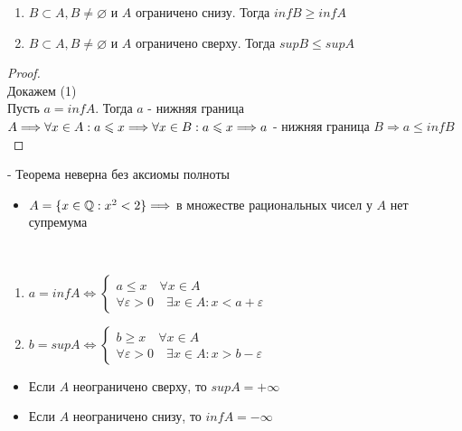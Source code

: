 \follow
\begin{enumerate}
    \item $B \subset A, B \neq \varnothing $ и $ A $ ограничено снизу. Тогда $inf B \geqslant inf A$
    \item $B \subset A, B \neq \varnothing $ и $ A $ ограничено сверху. Тогда $sup B \leqslant sup A$
\end{enumerate}
\begin{proof}
    \quad \\
    Докажем (1) \\
    Пусть $a = inf A$. Тогда $a$ - нижняя граница $A \Longrightarrow \forall x \in
    A : a \leqslant x \Longrightarrow \forall x \in B : a \leqslant x \Longrightarrow \\
    a$ - нижняя граница $B \Longrightarrow a \leqslant inf B$  
\end{proof}
\notice - Теорема неверна без аксиомы полноты \\
\begin{itemize}
    \item[] $A =\{x \in \mathbb{Q} : x^2 < 2\} \Longrightarrow$ в множестве рациональных чисел у $A$ нет супремума
\end{itemize}
\begin{theorem-non}
    \quad \\
    \begin{enumerate}
        \item $a = inf A \Longleftrightarrow 
        \begin{cases}
            a \leqslant x \quad \forall x \in A \\
            \forall \varepsilon > 0 \quad \exists x \in A : x < a + \varepsilon
        \end{cases}$ 
        \item $b = sup A \Longleftrightarrow 
        \begin{cases}
            b \geqslant x \quad \forall x \in A \\
            \forall \varepsilon > 0 \quad \exists x \in A : x > b - \varepsilon
        \end{cases}$ 
    \end{enumerate}
\end{theorem-non}
\notice
\begin{itemize}
    \item Если $A$ неограничено сверху, то $sup A = +\infty$
    \item Если $A$ неограничено снизу, то $inf A = -\infty$
\end{itemize}